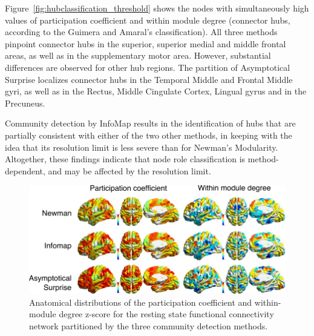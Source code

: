 Figure~\ref{fig:hubclassification_threshold} shows the nodes with simultaneously high values of participation coefficient and within module degree (connector hubs, according to the Guimera and Amaral's classification).
All three methods pinpoint connector hubs in the superior, superior medial and middle frontal areas, as well as in the supplementary motor area.
However, substantial differences are observed for other hub regions. The partition of Asymptotical Surprise localizes connector hubs in the Temporal Middle and Frontal Middle gyri, as well as in the Rectus, Middle Cingulate Cortex, Lingual gyrus and in the Precuneus.

Community detection by InfoMap results in the identification of hubs that are partially consistent with either of the two other methods, in keeping with the idea that its resolution limit is less severe than for Newman's Modularity.
Altogether, these findings indicate that node role classification is method-dependent, and may be affected by the resolution limit.

\begin{figure}[htb!]
\includegraphics[width=\textwidth]{images/pacopaperfigure8.pdf}
\caption{Anatomical distributions of the participation coefficient and within-module degree z-score for the resting state functional connectivity network partitioned by the three community detection methods.}
\label{fig:hubclassification}
\end{figure}


